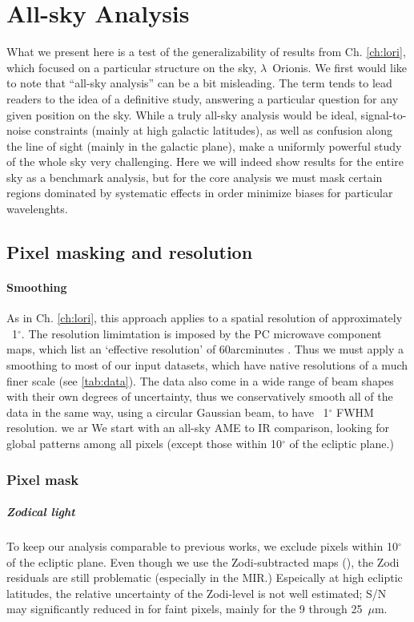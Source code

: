 \chapter{All-sky Analysis}
  \label{sec:analysis}

    What we present here is a test of the generalizability of results from Ch. \ref{ch:lori}, which focused on a particular structure on the sky, $\lambda$~Orionis.
    We first would like to note that ``all-sky analysis'' can be a bit misleading. The term tends to lead readers to the idea of a definitive study, answering a particular question for any given position on the sky.  While a truly all-sky analysis would be ideal, signal-to-noise constraints (mainly at high galactic latitudes), as well as confusion along the line of sight (mainly in the galactic plane), make a uniformly powerful study of the whole sky very challenging. Here we will indeed show results for the entire sky as a benchmark analysis, but for the core analysis we must mask certain regions dominated by systematic effects in order minimize biases for particular wavelenghts.



\section{Pixel masking and resolution}
    \subsubsection{Smoothing}
        As in Ch. \ref{ch:lori}, this approach applies to a spatial resolution of approximately ~1$^{\circ}$. The resolution limimtation is imposed by the PC microwave component maps, which list an `effective resolution' of 60arcminutes \citep{planck15X}. Thus we must apply a smoothing to most of our input datasets, which have native resolutions of a much finer scale (see \ref{tab:data}). The data also come in a wide range of beam shapes with their own degrees of uncertainty, thus we conservatively smooth all of the data in the same way, using a circular Gaussian beam, to have ~1$^{\circ}$ FWHM resolution. we ar We start with an all-sky AME to IR comparison, looking for global patterns among all pixels (except those within 10$^{\circ}$ of the ecliptic plane.)

    \subsection{Pixel mask}
      \paragraph{Zodical light}
        To keep our analysis comparable to previous works, we exclude pixels within 10$^{\circ}$ of the ecliptic plane. Even though we use the Zodi-subtracted maps (\citep{kelsall98, kondo16}), the Zodi residuals are still problematic (especially in the MIR.) Espeically at high ecliptic latitudes, the relative uncertainty of the Zodi-level is not well estimated; S/N may significantly reduced in for faint pixels, mainly for the 9 through 25~$\mu$m.

